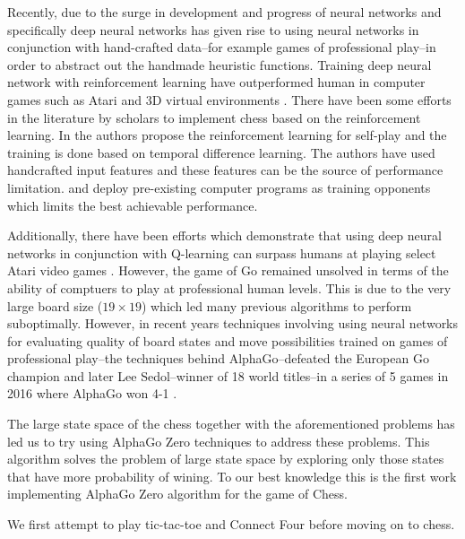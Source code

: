 \documentclass[english]{article}
\begin{document}
Recently, due to the surge in development and progress of neural networks and
specifically deep neural networks has given rise to using neural networks in
conjunction with hand-crafted data--for example games of professional play--in
order to abstract out the handmade heuristic functions.
Training deep neural network with reinforcement learning have outperformed
human in computer games such as Atari and 3D virtual environments
\cite{eight, nine, ten}. There have been some efforts in the literature by
scholars to implement chess based on the reinforcement learning. In
\cite{one, two, three} the authors propose the reinforcement learning for 
self-play and the training is done based on temporal difference learning.
The authors have used handcrafted input features and these features
can be the source of performance limitation. \cite{one} and \cite{two} deploy pre-existing
computer programs as training opponents which limits the best achievable
performance. 

Additionally, there have been efforts which demonstrate that using deep neural
networks in conjunction with Q-learning can surpass humans at playing select
Atari video games \cite{DQN}. However, the game of Go remained unsolved in terms
of the ability of comptuers to play at professional human levels. This is due
to the very large board size ($19 \times 19$) which led many previous algorithms
to perform suboptimally. However, in recent years techniques involving using
neural networks for evaluating quality of board states and move possibilities
trained on games of professional play--the techniques behind AlphaGo--defeated the
European Go champion and later Lee Sedol--winner of 18 world titles--in a series
of 5 games in 2016 where AlphaGo won 4-1 \cite{AlphaGo, deepmind}.

The large state space of the chess together with the
aforementioned problems has led us to try using AlphaGo Zero techniques
to address these problems. This algorithm solves the problem
of large state space by exploring only those states that have more
probability of wining. To our best knowledge this is the first work
implementing AlphaGo Zero algorithm for the game of Chess.

We first attempt to play tic-tac-toe and Connect Four before moving on to chess.
\end{document}
